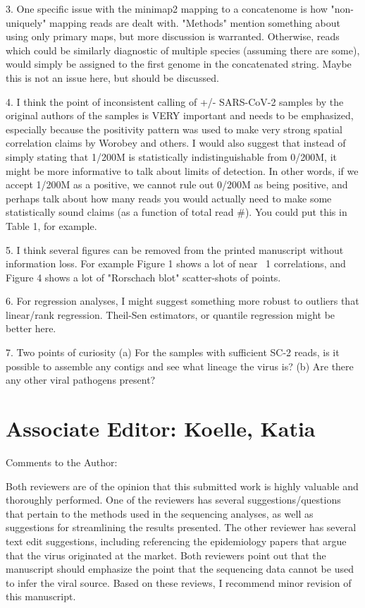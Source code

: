 \documentclass[11pt, oneside]{article}   	%
\begin{document}
3. One specific issue with the minimap2 mapping to a concatenome is how "non-uniquely" mapping reads are dealt with. "Methods" mention something about using only primary maps, but more discussion is warranted. Otherwise, reads which could be similarly diagnostic of multiple species (assuming there are some), would simply be assigned to the first genome in the concatenated string. Maybe this is not an issue here, but should be discussed.

4. I think the point of inconsistent calling of +/- SARS-CoV-2 samples by the original authors of the samples is VERY important and needs to be emphasized, especially because the positivity pattern was used to make very strong spatial correlation claims by Worobey and others. I would also suggest that instead of simply stating that 1/200M is statistically indistinguishable from 0/200M, it might be more informative to talk about limits of detection. In other words, if we accept 1/200M as a positive, we cannot rule out 0/200M as being positive, and perhaps talk about how many reads you would actually need to make some statistically sound claims (as a function of total read \#). You could put this in Table 1, for example.

5. I think several figures can be removed from the printed manuscript without information loss. For example Figure 1 shows a lot of near ~1 correlations, and Figure 4 shows a lot of "Rorschach blot" scatter-shots of points.

6. For regression analyses, I might suggest something more robust to outliers that linear/rank regression. Theil-Sen estimators, or quantile regression might be better here.

7. Two points of curiosity
   (a) For the samples with sufficient SC-2 reads, is it possible to assemble any contigs and see what lineage the virus is?
   (b) Are there any other viral pathogens present?


\section*{Associate Editor: Koelle, Katia}

Comments to the Author:

Both reviewers are of the opinion that this submitted work is highly valuable and thoroughly performed. One of the reviewers has several suggestions/questions that pertain to the methods used in the sequencing analyses, as well as suggestions for streamlining the results presented. The other reviewer has several text edit suggestions, including referencing the epidemiology papers that argue that the virus originated at the market. Both reviewers point out that the manuscript should emphasize the point that the sequencing data cannot be used to infer the viral source. Based on these reviews, I recommend minor revision of this manuscript.

\color{black}

{\small

}
\end{document}
